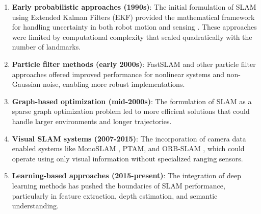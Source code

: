 \documentclass[12pt]{article}
\begin{document}
    \begin{enumerate}
        \item \textbf{Early probabilistic approaches (1990s)}: The initial formulation of SLAM using Extended Kalman Filters (EKF) provided the mathematical framework for 
        handling uncertainty in both robot motion and sensing \cite{early_probabilistic_approaches}. These approaches were limited by computational complexity that scaled quadratically with the number of landmarks.
        \item \textbf{Particle filter methods (early 2000s)}: FastSLAM \cite{fast_slam} and other particle filter approaches offered improved performance for nonlinear systems and 
        non-Gaussian noise, enabling more robust implementations.
        \item \textbf{Graph-based optimization (mid-2000s)}: The formulation of SLAM as a sparse graph optimization problem led to more efficient solutions 
        that could handle larger environments and longer trajectories.
        \item \textbf{Visual SLAM systems (2007-2015)}: The incorporation of camera data enabled systems like MonoSLAM \cite{monoslam}, PTAM, and ORB-SLAM \cite{orb_slam}, which could operate 
        using only visual information without specialized ranging sensors.
        \newpage
        \item \textbf{Learning-based approaches (2015-present)}: The integration of deep learning methods has pushed the boundaries of SLAM performance, particularly 
        in feature extraction, depth estimation, and semantic understanding.
    \end{enumerate}
\end{document}
